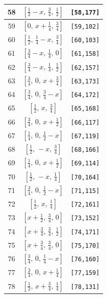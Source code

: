 \documentclass[fleqn,8pt]{jsarticle}
\begin{document}
\begin{longtable}{ccc}
58 & $\left[ \frac{1}{2} - x,\, \frac{3}{4},\, \frac{1}{2} \right]$ & {\tt [58,177]} \\ \hline
59 & $\left[ 0,\, x + \frac{1}{4},\, \frac{3}{4} \right]$ & {\tt [59,102]} \\ \hline
60 & $\left[ \frac{1}{2},\, \frac{1}{4} - x,\, \frac{3}{4} \right]$ & {\tt [60,103]} \\ \hline
61 & $\left[ \frac{3}{4} - x,\, \frac{1}{4},\, 0 \right]$ & {\tt [61,158]} \\ \hline
62 & $\left[ \frac{3}{4} - x,\, \frac{1}{4},\, \frac{1}{2} \right]$ & {\tt [62,157]} \\ \hline
63 & $\left[ \frac{3}{4},\, 0,\, x + \frac{3}{4} \right]$ & {\tt [63,173]} \\ \hline
64 & $\left[ \frac{3}{4},\, 0,\, \frac{3}{4} - x \right]$ & {\tt [64,172]} \\ \hline
65 & $\left[ \frac{1}{2},\, x,\, \frac{3}{4} \right]$ & {\tt [65,168]} \\ \hline
66 & $\left[ \frac{3}{4},\, 0,\, x + \frac{1}{2} \right]$ & {\tt [66,117]} \\ \hline
67 & $\left[ \frac{1}{4},\, 0,\, \frac{1}{2} - x \right]$ & {\tt [67,119]} \\ \hline
68 & $\left[ \frac{1}{2},\, - x,\, \frac{3}{4} \right]$ & {\tt [68,166]} \\ \hline
69 & $\left[ \frac{1}{4},\, 0,\, x + \frac{1}{2} \right]$ & {\tt [69,114]} \\ \hline
70 & $\left[ \frac{1}{2},\, - x,\, \frac{1}{4} \right]$ & {\tt [70,164]} \\ \hline
71 & $\left[ \frac{3}{4},\, 0,\, \frac{1}{2} - x \right]$ & {\tt [71,115]} \\ \hline
72 & $\left[ \frac{1}{2},\, x,\, \frac{1}{4} \right]$ & {\tt [72,161]} \\ \hline
73 & $\left[ x + \frac{1}{2},\, \frac{3}{4},\, 0 \right]$ & {\tt [73,152]} \\ \hline
74 & $\left[ x + \frac{3}{4},\, \frac{3}{4},\, \frac{1}{2} \right]$ & {\tt [74,171]} \\ \hline
75 & $\left[ x + \frac{3}{4},\, \frac{3}{4},\, 0 \right]$ & {\tt [75,170]} \\ \hline
76 & $\left[ \frac{3}{4},\, 0,\, \frac{1}{4} - x \right]$ & {\tt [76,160]} \\ \hline
77 & $\left[ \frac{3}{4},\, 0,\, x + \frac{1}{4} \right]$ & {\tt [77,159]} \\ \hline
78 & $\left[ \frac{1}{2},\, x + \frac{3}{4},\, \frac{1}{4} \right]$ & {\tt [78,131]} \\ \hline

\end{longtable}
\end{document}
